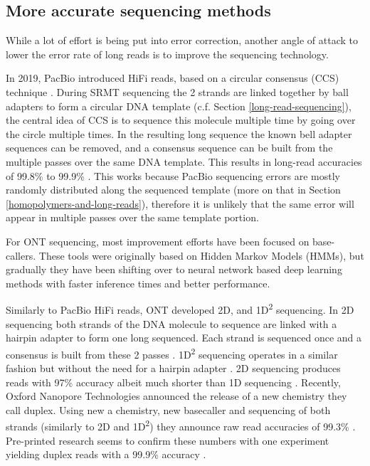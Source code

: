 \documentclass[
  11pt,
  twoside]{scrbook}
\begin{document}
\hypertarget{more-accurate-sequencing-methods}{%
\subsection{More accurate sequencing methods}\label{more-accurate-sequencing-methods}}

While a lot of effort is being put into error correction, another angle of attack to lower the error rate of long reads is to improve the sequencing technology.

In 2019, PacBio introduced HiFi reads, based on a circular consensus (CCS) technique \autocite{wenger2019}. During SRMT sequencing the 2 strands are linked together by ball adapters to form a circular DNA template (c.f. Section \ref{long-read-sequencing}), the central idea of CCS is to sequence this molecule multiple time by going over the circle multiple times. In the resulting long sequence the known bell adapter sequences can be removed, and a consensus sequence can be built from the multiple passes over the same DNA template. This results in long-read accuracies of 99.8\% to 99.9\% \autocite{wenger2019,logsdonLongreadHumanGenome2020}. This works because PacBio sequencing errors are mostly randomly distributed along the sequenced template (more on that in Section \ref{homopolymers-and-long-reads}), therefore it is unlikely that the same error will appear in multiple passes over the same template portion.

For ONT sequencing, most improvement efforts have been focused on base-callers. These tools were originally based on Hidden Markov Models \autocite{timpDNABaseCallingNanopore2012} (HMMs), but gradually they have been shifting over to neural network based deep learning methods \autocite{peresiniNanoporeBaseCalling2021,bozaDeepNanoDeepRecurrent2017,wickPerformanceNeuralNetwork2019,amarasingheOpportunitiesChallengesLongread2020} with faster inference times and better performance.

Similarly to PacBio HiFi reads, ONT developed 2D, and 1D\textsuperscript{2} sequencing. In 2D sequencing both strands of the DNA molecule to sequence are linked with a hairpin adapter to form one long sequenced. Each strand is sequenced once and a consensus is built from these 2 passes \autocite{tylerEvaluationOxfordNanopore2018}. 1D\textsuperscript{2} sequencing operates in a similar fashion but without the need for a hairpin adapter \autocite{linNanoporeTechnologyIts2021}. 2D sequencing produces reads with 97\% accuracy albeit much shorter than 1D sequencing \autocite{tylerEvaluationOxfordNanopore2018}. Recently, Oxford Nanopore Technologies announced the release of a new chemistry they call duplex. Using new a chemistry, new basecaller and sequencing of both strands (similarly to 2D and 1D\textsuperscript{2}) they announce raw read accuracies of 99.3\% \autocite{OxfordNanoporeTech}. Pre-printed research seems to confirm these numbers with one experiment yielding duplex reads with a 99.9\% accuracy \autocite{sandersonComparisonR9Kit102022}.
\end{document}
